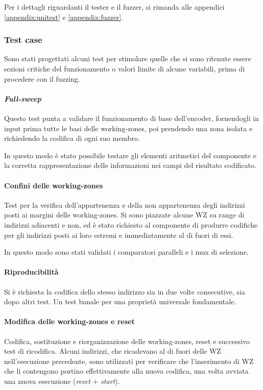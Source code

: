 \documentclass[11pt,a4paper]{article}
\begin{document}
Per i dettagli riguardanti il tester e il fuzzer, si rimanda alle appendici \ref{appendix:unitest} e \ref{appendix:fuzzer}.

\subsubsection{Test case}
Sono stati progettati alcuni test per stimolare quelle che si sono ritenute essere sezioni critiche del funzionamento o valori limite di alcune variabili,
prima di procedere con il fuzzing.

\paragraph{\emph{Full-sweep}}
Questo test punta a validare il funzionamento di base dell'encoder, fornendogli in input prima tutte le basi delle working-zones, poi prendendo una zona
isolata e richiedendo la codifica di ogni suo membro.

In questo modo è stato possibile testare gli elementi aritmetici del componente e la corretta rappresentazione delle informazioni nei campi del risultato
codificato.

\paragraph{Confini delle working-zones}
Test per la verifica dell'appartenenza e della non appartenenza degli indirizzi posti ai margini delle working-zones. Si sono piazzate alcune WZ su range
di indirizzi adiacenti e non, ed è stato richiesto al componente di produrre codifiche per gli indirizzi posti ai loro estremi e immediatamente al di
fuori di essi.

In questo modo sono stati validati i comparatori paralleli e i mux di selezione.

\paragraph{Riproducibilità}
Si è richiesta la codifica dello stesso indirizzo sia in due volte consecutive, sia dopo altri test. Un test banale per una proprietà universale
fondamentale.

\paragraph{Modifica delle working-zones e reset}
Codifica, sostituzione e riorganizzazione delle working-zones, reset e successivo test di ricodifica. Alcuni indirizzi, che ricadevano al di fuori delle WZ
nell'esecuzione precedente, sono utilizzati per verificare che l'inserimento di WZ che li contengono portino effettivamente alla nuova codifica, una volta
avviata una nuova esecuzione (\emph{reset} + \emph{start}).
\end{document}
